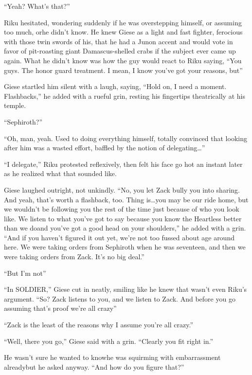 ``Yeah? What's that?''

Riku hesitated, wondering suddenly if he was overstepping himself, or assuming too much, or\textemdash he didn't know. He knew Giese as a light and fast fighter, ferocious with those twin swords of his, that he had a Junon accent and would vote in favor of pit-roasting giant Damascus-shelled crabs if the subject ever came up again. What he didn't know was how the guy would react to Riku saying, ``You guys. The honor guard treatment. I mean, I know you've got your reasons, but\textemdash''

Giese startled him silent with a laugh, saying, ``Hold on, I need a moment. Flashbacks,'' he added with a rueful grin, resting his fingertips theatrically at his temple.

``Sephiroth?''

``Oh, man, yeah. Used to doing everything himself, totally convinced that looking after him was a wasted effort, baffled by the notion of delegating\ldots''

``I delegate,'' Riku protested reflexively, then felt his face go hot an instant later as he realized what that sounded like.

Giese laughed outright, not unkindly. ``No, you let Zack bully you into sharing. And yeah, that's worth a flashback, too. Thing is\ldots you may be our ride home, but we wouldn't be following you the rest of the time just because of who you look like. We listen to what you've got to say because you know the Heartless better than we do\textemdash and you've got a good head on your shoulders,'' he added with a grin. ``And if you haven't figured it out yet, we're not too fussed about age around here. We were taking orders from Sephiroth when he was seventeen, and then we were taking orders from Zack. It's no big deal.''

``But I'm not\textemdash''

``In SOLDIER,'' Giese cut in neatly, smiling like he knew that wasn't even Riku's argument. ``So? Zack listens to you, and we listen to Zack. And before you go assuming that's proof we're all crazy\textemdash''

``Zack is the least of the reasons why I assume you're all crazy.''

``Well, there you go,'' Giese said with a grin. ``Clearly you fit right in.''

He wasn't sure he wanted to know\textemdash he was squirming with embarrassment already\textemdash but he asked anyway. ``And how do you figure that?''

